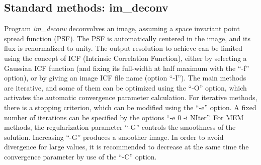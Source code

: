 \begin{itemize}
\subsection{Standard methods: im\_deconv}
Program 
{\em im\_deconv} deconvolves an image, assuming a space 
invariant point spread
function (PSF). The PSF is automatically centered in the image, and
its flux is renormalized to unity. The output resolution to achieve can 
be limited using the concept of ICF (Intrinsic Correlation Function),
either by selecting a Gaussian ICF function (and fixing its full-width
at half maximum with the ``-f'' option), or by giving an image ICF file name
(option ``-I''). The main 
methods are iterative, and some of them can be optimized
using the ``-O'' option, which activates the automatic convergence parameter
calculation. For iterative methods, there is a stopping criterion,
which can be modified using the ``-e'' option. A fixed number of iterations
can be specified by the options ``-e 0 -i NIter''.
For MEM methods, the regularization parameter ``-G'' controls the smoothness
of the solution. Increasing ``-G'' produces a smoother image. In order to
avoid divergence for large values, it is recommended to decrease at the 
same time the convergence parameter by use of the ``-C'' option.


\end{itemize}
